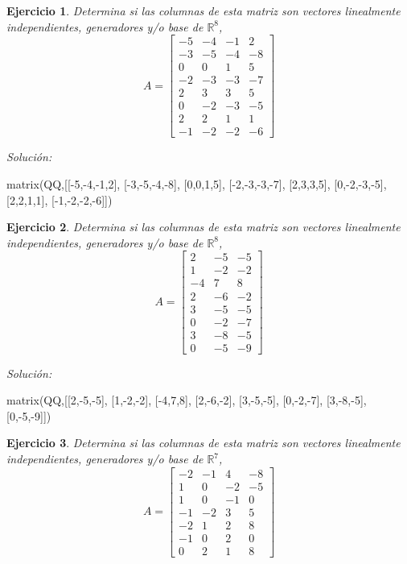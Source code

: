 \documentclass{amsart}
\newtheorem{ejer}{Ejercicio}
\begin{document}
\begin{ejer} Determina si las columnas de esta matriz son vectores linealmente independientes, generadores y/o base de ${{\mathbb R}}^{8}$,
\[ A = \left[\begin{array}{rrrr}
-5 & -4 & -1 & 2 \\
-3 & -5 & -4 & -8 \\
0 & 0 & 1 & 5 \\
-2 & -3 & -3 & -7 \\
2 & 3 & 3 & 5 \\
0 & -2 & -3 & -5 \\
2 & 2 & 1 & 1 \\
-1 & -2 & -2 & -6
\end{array}\right] \]
\end{ejer}

{\it Soluci\'on:}

\begin{sageblock}
matrix(QQ,[[-5,-4,-1,2],
[-3,-5,-4,-8],
[0,0,1,5],
[-2,-3,-3,-7],
[2,3,3,5],
[0,-2,-3,-5],
[2,2,1,1],
[-1,-2,-2,-6]])
\end{sageblock}



\begin{ejer} Determina si las columnas de esta matriz son vectores linealmente independientes, generadores y/o base de ${{\mathbb R}}^{8}$,
\[ A = \left[\begin{array}{rrr}
2 & -5 & -5 \\
1 & -2 & -2 \\
-4 & 7 & 8 \\
2 & -6 & -2 \\
3 & -5 & -5 \\
0 & -2 & -7 \\
3 & -8 & -5 \\
0 & -5 & -9
\end{array}\right] \]
\end{ejer}

{\it Soluci\'on:}

\begin{sageblock}
matrix(QQ,[[2,-5,-5],
[1,-2,-2],
[-4,7,8],
[2,-6,-2],
[3,-5,-5],
[0,-2,-7],
[3,-8,-5],
[0,-5,-9]])
\end{sageblock}



\begin{ejer} Determina si las columnas de esta matriz son vectores linealmente independientes, generadores y/o base de ${{\mathbb R}}^{7}$,
\[ A = \left[\begin{array}{rrrr}
-2 & -1 & 4 & -8 \\
1 & 0 & -2 & -5 \\
1 & 0 & -1 & 0 \\
-1 & -2 & 3 & 5 \\
-2 & 1 & 2 & 8 \\
-1 & 0 & 2 & 0 \\
0 & 2 & 1 & 8
\end{array}\right] \]
\end{ejer}
\end{document}
